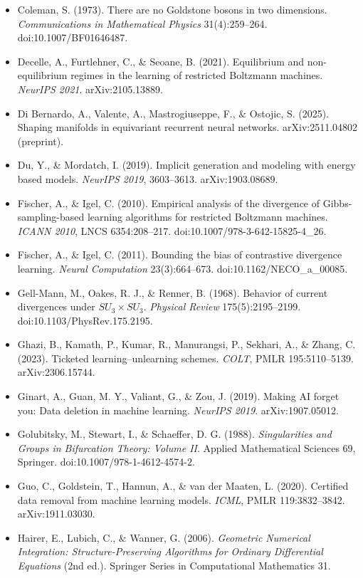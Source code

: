 \documentclass{article}
\begin{document}
\begin{itemize}
\item Coleman, S. (1973). There are no Goldstone bosons in two dimensions. \emph{Communications in Mathematical Physics} 31(4):259--264. doi:10.1007/BF01646487.
\item Decelle, A., Furtlehner, C., \& Seoane, B. (2021). Equilibrium and non-equilibrium regimes in the learning of restricted Boltzmann machines. \emph{NeurIPS 2021}. arXiv:2105.13889.
\item Di Bernardo, A., Valente, A., Mastrogiuseppe, F., \& Ostojic, S. (2025). Shaping manifolds in equivariant recurrent neural networks. arXiv:2511.04802 (preprint).
\item Du, Y., \& Mordatch, I. (2019). Implicit generation and modeling with energy based models. \emph{NeurIPS 2019}, 3603--3613. arXiv:1903.08689.
\item Fischer, A., \& Igel, C. (2010). Empirical analysis of the divergence of Gibbs-sampling-based learning algorithms for restricted Boltzmann machines. \emph{ICANN 2010}, LNCS 6354:208--217. doi:10.1007/978-3-642-15825-4\_26.
\item Fischer, A., \& Igel, C. (2011). Bounding the bias of contrastive divergence learning. \emph{Neural Computation} 23(3):664--673. doi:10.1162/NECO\_a\_00085.
\item Gell-Mann, M., Oakes, R. J., \& Renner, B. (1968). Behavior of current divergences under $SU_3\times SU_3$. \emph{Physical Review} 175(5):2195--2199. doi:10.1103/PhysRev.175.2195.
\item Ghazi, B., Kamath, P., Kumar, R., Manurangsi, P., Sekhari, A., \& Zhang, C. (2023). Ticketed learning--unlearning schemes. \emph{COLT}, PMLR 195:5110--5139. arXiv:2306.15744.
\item Ginart, A., Guan, M. Y., Valiant, G., \& Zou, J. (2019). Making AI forget you: Data deletion in machine learning. \emph{NeurIPS 2019}. arXiv:1907.05012.
\item Golubitsky, M., Stewart, I., \& Schaeffer, D. G. (1988). \emph{Singularities and Groups in Bifurcation Theory: Volume II}. Applied Mathematical Sciences 69, Springer. doi:10.1007/978-1-4612-4574-2.
\item Guo, C., Goldstein, T., Hannun, A., \& van der Maaten, L. (2020). Certified data removal from machine learning models. \emph{ICML}, PMLR 119:3832--3842. arXiv:1911.03030.
\item Hairer, E., Lubich, C., \& Wanner, G. (2006). \emph{Geometric Numerical Integration: Structure-Preserving Algorithms for Ordinary Differential Equations} (2nd ed.). Springer Series in Computational Mathematics 31.

\end{itemize}
\end{document}

